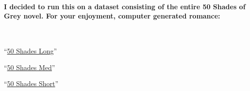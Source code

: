 \documentclass[10pt,a4paper]{report}
\begin{document}
\paragraph{I decided to run this on a dataset consisting of the entire 50 Shades of Grey novel. For your enjoyment, computer generated romance:}
\
\vspace{5mm}

``\href{https://raw.githubusercontent.com/AlexKShah/MSCS692/master/midterm/output/50shades-long.txt}{50 Shades Long}''

\vspace{5mm}

``\href{https://raw.githubusercontent.com/AlexKShah/MSCS692/master/midterm/output/50shades.txt}{50 Shades Med}''

\vspace{5mm}

``\href{https://raw.githubusercontent.com/AlexKShah/MSCS692/master/midterm/output/50shades-short.txt}{50 Shades Short}''
\
\end{document}
